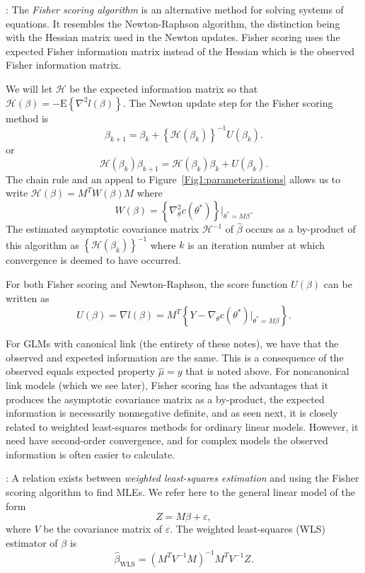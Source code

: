 \documentclass[12pt]{article}
\newcommand{\E}{\mathrm{E}}
\newcommand{\Hcal}{\mathcal{H}}
\DeclareMathOperator{\E}{E}
\begin{document}
\vspace*{0.5cm}: The \emph{Fisher scoring algorithm} is an alternative method for solving systems of equations. It resembles the Newton-Raphson algorithm, the distinction being with the Hessian matrix used in the Newton updates. Fisher scoring uses the expected Fisher information matrix instead of the Hessian which is the observed Fisher information matrix. 

We will let $\Hcal$ be the expected information matrix so that $\Hcal(\beta) = -\E\left\{\nabla^2 l(\beta)\right\}$. The Newton update step for the Fisher scoring method is 
$$
  \beta_{k+1} = \beta_k + \left\{\Hcal(\beta_k)\right\}^{-1} U(\beta_k).
$$
or
\begin{equation} \label{eq:FS}
  \Hcal(\beta_k)\beta_{k+1} = \Hcal(\beta_k)\beta_k + U(\beta_k).
\end{equation}
The chain rule and an appeal to Figure~\ref{Fig1:parameterizations} allows us to write $\Hcal(\beta) = M^TW(\beta)M$ where 
$$
  W(\beta) = \left\{\nabla_\theta^2 c(\theta^*)\right\}|_{\theta^* = M\beta}.
$$
The estimated asymptotic covariance matrix $\Hcal^{-1}$ of $\hat{\beta}$ occurs as a by-product of this algorithm as $\left\{\Hcal(\beta_k)\right\}^{-1}$ where $k$ is an iteration number at which convergence is deemed to have occurred. 

\vspace*{0.5cm}

For both Fisher scoring and Newton-Raphson, the score function $U(\beta)$ can be written as
$$
  U(\beta) = \nabla l(\beta) = M^T\left\{Y - \nabla_\theta c(\theta^*)|_{\theta^* = M\beta}\right\}. 
$$

For GLMs with canonical link (the entirety of these notes), we have that the observed and expected information are the same. This is a consequence of the observed equals expected property $\hat{\mu} = y$ that is noted above. For noncanonical link models (which we see later), Fisher scoring has the advantages that it produces the asymptotic covariance matrix as a by-product, the expected information is necessarily nonnegative definite, and as seen next, it is closely related to weighted least-squares methods for ordinary linear models. However, it need have second-order convergence, and for complex models the observed information is often easier to calculate.


\vspace*{0.5cm}: A relation exists between \emph{weighted least-squares estimation} and using the Fisher scoring algorithm to find MLEs. We refer here to the general linear model of the form 
$$
  Z = M\beta + \varepsilon,
$$
where $V$ be the covariance matrix of $\varepsilon$. The weighted least-squares (WLS) estimator of $\beta$ is 
$$
  \hat\beta_{\text{WLS}} = \left(M^TV^{-1}M\right)^{-1}M^TV^{-1}Z.
$$
\end{document}
